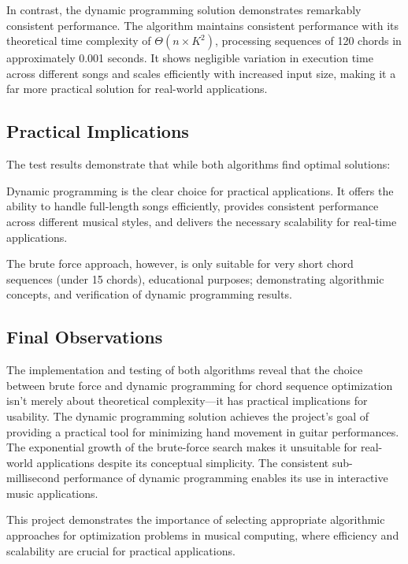 \documentclass[conference]{IEEEtran}
\begin{document}
In contrast, the dynamic programming solution demonstrates remarkably consistent performance. The algorithm maintains consistent performance with its theoretical time complexity of \(\Theta(n \times K^2)\), processing sequences of 120 chords in approximately 0.001 seconds. It shows negligible variation in execution time across different songs and scales efficiently with increased input size, making it a far more practical solution for real-world applications.

\subsection{Practical Implications}
The test results demonstrate that while both algorithms find optimal solutions:

Dynamic programming is the clear choice for practical applications. It offers the ability to handle full-length songs efficiently, provides consistent performance across different musical styles, and delivers the necessary scalability for real-time applications.

The brute force approach, however, is only suitable for very short chord sequences (under 15 chords), educational purposes; demonstrating algorithmic concepts, and verification of dynamic programming results.

\subsection{Final Observations}
The implementation and testing of both algorithms reveal that the choice between brute force and dynamic programming for chord sequence optimization isn't merely about theoretical complexity—it has practical implications for usability. The dynamic programming solution achieves the project's goal of providing a practical tool for minimizing hand movement in guitar performances. The exponential growth of the brute-force search makes it unsuitable for real-world applications despite its conceptual simplicity. The consistent sub-millisecond performance of dynamic programming enables its use in interactive music applications.

This project demonstrates the importance of selecting appropriate algorithmic approaches for optimization problems in musical computing, where efficiency and scalability are crucial for practical applications.



\end{document}
